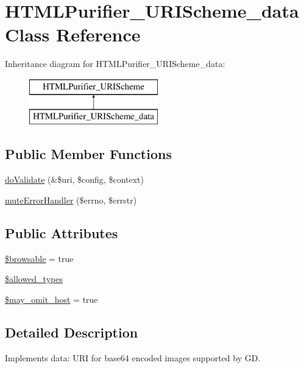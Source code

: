 \hypertarget{classHTMLPurifier__URIScheme__data}{\section{H\+T\+M\+L\+Purifier\+\_\+\+U\+R\+I\+Scheme\+\_\+data Class Reference}
\label{classHTMLPurifier__URIScheme__data}
}
Inheritance diagram for H\+T\+M\+L\+Purifier\+\_\+\+U\+R\+I\+Scheme\+\_\+data\+:\begin{figure}[H]
\begin{center}
\leavevmode
\includegraphics[height=2.000000cm]{classHTMLPurifier__URIScheme__data}
\end{center}
\end{figure}
\subsection*{Public Member Functions}
\begin{DoxyCompactItemize}
\item 
\hyperlink{classHTMLPurifier__URIScheme__data_a555789537b85ba30ca2ee0643fc82ea4}{do\+Validate} (\&\$uri, \$config, \$context)
\item 
\hyperlink{classHTMLPurifier__URIScheme__data_a2cfe0f29e55820ce70d1a92308d0f204}{mute\+Error\+Handler} (\$errno, \$errstr)
\end{DoxyCompactItemize}
\subsection*{Public Attributes}
\begin{DoxyCompactItemize}
\item 
\hyperlink{classHTMLPurifier__URIScheme__data_a2d60b4a273c9f16a1a9edc48b3f12fe8}{\$browsable} = true
\item 
\hyperlink{classHTMLPurifier__URIScheme__data_a2be7445398e03794937d6f8ab28e305d}{\$allowed\+\_\+types}
\item 
\hyperlink{classHTMLPurifier__URIScheme__data_a34d953efd10dd8236b299aac1b4da60b}{\$may\+\_\+omit\+\_\+host} = true
\end{DoxyCompactItemize}


\subsection{Detailed Description}
Implements data\+: U\+R\+I for base64 encoded images supported by G\+D. 

